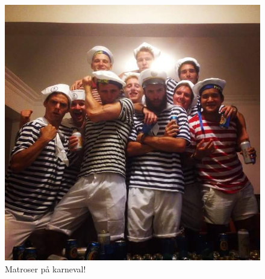 \begin{figure}[H]
	\centering
	\includegraphics[width=\textwidth]{matroser}
	\caption*{Matroser på karneval!}
	\label{fig:karneval}
\end{figure}



